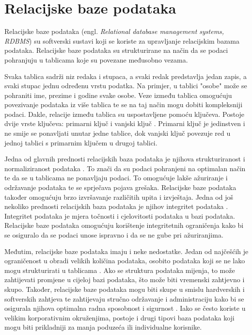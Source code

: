 \documentclass[]{foi} %
\begin{document}
\section{Relacijske baze podataka}

Relacijske baze podataka (engl. \textit{Relational database management systems, RDBMS}) \cite{tbp} su softverski sustavi koji se koriste za upravljanje relacijskim bazama podataka. Relacijske baze podataka su strukturirane na način da se podaci pohranjuju u tablicama koje su povezane međusobno vezama.

Svaka tablica sadrži niz redaka i stupaca, a svaki redak predstavlja jedan zapis, a svaki stupac jednu određenu vrstu podatka. Na primjer, u tablici "osobe" može se pohraniti ime, prezime i godine svake osobe. Veze između tablica omogućuju povezivanje podataka iz više tablica te se na taj način mogu dobiti kompleksniji podaci. Dakle, relacije između tablica su uspostavljene pomoću ključeva. Postoje dvije vrste ključeva: primarni ključ i vanjski ključ \cite{tbp}. Primarni ključ je jedinstven i ne smije se ponavljati unutar jedne tablice, dok vanjski ključ povezuje red u jednoj tablici s primarnim ključem u drugoj tablici.

Jedna od glavnih prednosti relacijskih baza podataka je njihova strukturiranost i normaliziranost podataka \cite{tbp}. To znači da su podaci pohranjeni na optimalan način te da se u tablicama ne ponavljaju podaci. To omogućuje lakše ažuriranje i održavanje podataka te se sprječava pojava grešaka. Relacijske baze podataka također omogućuju brzo izvršavanje različitih upita i izvještaja. Jedna od još nekoliko prednosti relacijskih baza podataka je njihov integritet podataka \cite{tbp}. Integritet podataka je mjera točnosti i cjelovitosti podataka u bazi podataka. Relacijske baze podataka omogućuju korištenje integritetnih ograničenja kako bi se osiguralo da se podaci unose ispravno i da se ne gube pri ažuriranjima.

Međutim, relacijske baze podataka imaju i neke nedostatke. Jedan od najčešćih je ograničenost u obradi velikih količina podataka, osobito podataka koji se ne lako mogu strukturirati u tablicama \cite{tbp}. Ako se struktura podataka mijenja, to može zahtijevati promjene u cijeloj bazi podataka, što može biti vremenski zahtjevno i skupo. Također, relacijske baze podataka mogu biti skupe u smislu hardverskih i softverskih zahtjeva te zahtijevaju stručno održavanje i administraciju kako bi se osigurala njihova optimalna radna sposobnost i sigurnost \cite{tbp}. Iako se često koriste u velikim korporativnim okruženjima, postoje i drugi tipovi baza podataka koji mogu biti prikladniji za manja poduzeća ili individualne korisnike.
\newpage
\end{document}

